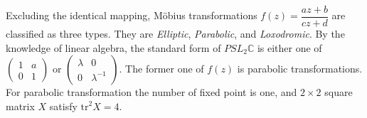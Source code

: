 Excluding the identical mapping, M\"obius transformations
$f(z) = \dfrac{az + b}{cz + d}$ are classified as three types.
They are \textit{Elliptic}, \textit{Parabolic}, and \textit{Loxodromic}.
By the knowledge of linear algebra, the standard form of $PSL_2\mathbb{C}$
is either one of $\begin{pmatrix}1 & a \\ 0 & 1 \end{pmatrix}$ or
$\begin{pmatrix}\lambda & 0 \\ 0 & \lambda^{-1} \end{pmatrix}$.
The former one of $f(z)$ is parabolic transformations.
For parabolic transformation the number of fixed point is one, and
$2 \times 2$ square matrix $X$ satisfy $\mathrm{tr}^2X = 4$.

